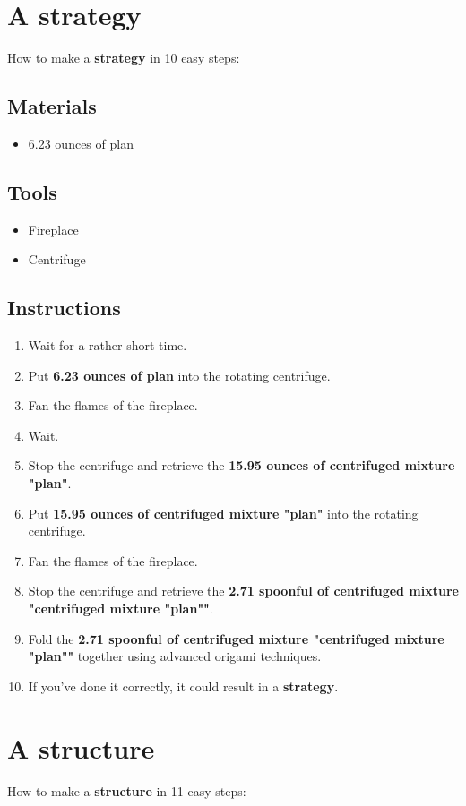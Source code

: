 \documentclass{article}
\begin{document}
\section{A strategy}How to make a \textbf{strategy} in 10 easy steps:

\subsection{Materials}\begin{itemize}
\item 
6.23 ounces of plan
\end{itemize}
\subsection{Tools}\begin{itemize}
\item 
Fireplace
\item 
Centrifuge
\end{itemize}
\subsection{Instructions}\begin{enumerate}
\item 
Wait for a rather short time.
\item 
Put \textbf{6.23 ounces of plan} into the rotating centrifuge.
\item 
Fan the flames of the fireplace.
\item 
Wait.
\item 
Stop the centrifuge and retrieve the \textbf{15.95 ounces of centrifuged mixture "plan"}.
\item 
Put \textbf{15.95 ounces of centrifuged mixture "plan"} into the rotating centrifuge.
\item 
Fan the flames of the fireplace.
\item 
Stop the centrifuge and retrieve the \textbf{2.71 spoonful of centrifuged mixture "centrifuged mixture "plan""}.
\item 
Fold the \textbf{2.71 spoonful of centrifuged mixture "centrifuged mixture "plan""} together using advanced origami techniques.
\item 
If you've done it correctly, it could result in a \textbf{strategy}.
\end{enumerate}
\newpage
\section{A structure}How to make a \textbf{structure} in 11 easy steps:
\end{document}
